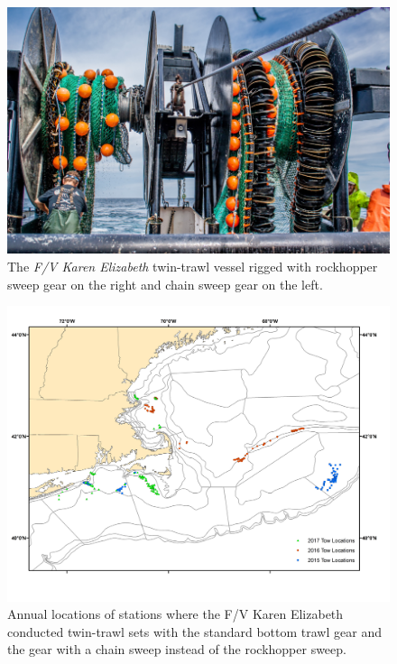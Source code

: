 \documentclass[
  12pt,
]{article}
\begin{document}
\begin{figure}
\caption{The \textsl{F/V Karen Elizabeth} twin-trawl vessel rigged with rockhopper sweep gear on the right and chain sweep gear on the left.}\label{twin_trawl_photo}
\begin{center}
\includegraphics[width = \textwidth]{twin_trawl_photo_small.png}
\end{center}
\end{figure}

\begin{landscape}
\begin{figure}
\caption{Annual locations of stations where the F/V Karen Elizabeth conducted twin-trawl sets with the standard bottom trawl gear and the gear with a chain sweep instead of the rockhopper sweep.}\label{tow_locations}
\begin{center}
\includegraphics[width = \textwidth]{TwinTrawlLocationsAllYears.jpg}
\end{center}
\end{figure}
\end{landscape}
\end{document}
